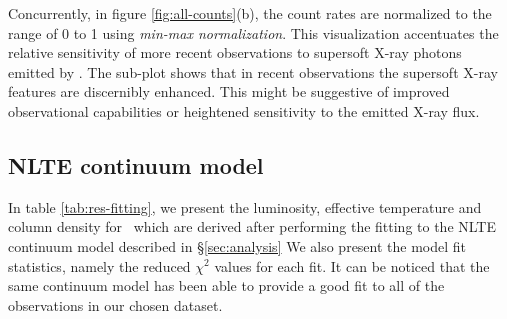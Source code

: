     Concurrently, in figure \ref{fig:all-counts}(b), the count rates are normalized to the range of 0 to 1 using \textit{min-max normalization}. This visualization accentuates the relative sensitivity of more recent observations to supersoft X-ray photons emitted by \source. The sub-plot shows that in recent observations the supersoft X-ray features are discernibly enhanced. This might be suggestive of improved observational capabilities or heightened sensitivity to the emitted X-ray flux.
    
    
    \subsection{NLTE continuum model}
    In table \ref{tab:res-fitting}, we present the luminosity, effective temperature and column density for \source\ which are derived after performing the fitting to the NLTE continuum model described in \S \ref{sec:analysis} We also present the model fit statistics, namely the reduced $\chi^2$ values for each fit. It can be noticed that the same continuum model has been able to provide a good fit to all of the observations in our chosen dataset.
